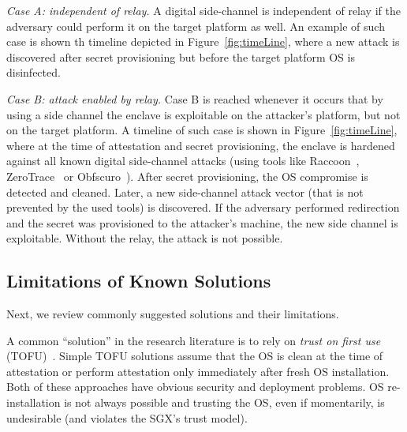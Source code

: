 \begin{mylist}
    \item[\emph{Case A: independent of relay.}] A digital side-channel is independent of relay if the adversary could perform it on the target platform as well. An example of such case is shown th timeline depicted in Figure~\ref{fig:timeLine}, where a new attack is discovered after secret provisioning but before the target platform OS is disinfected.
    

    \item[\emph{Case B: attack enabled by relay.}] Case B is reached whenever it occurs that by using a side channel the enclave is exploitable on the attacker's platform, but not on the target platform. 
    A timeline of such case is shown in Figure~\ref{fig:timeLine}, where at the time of attestation and secret provisioning, the enclave is hardened against all known digital side-channel attacks (using tools like Raccoon~\cite{raccoon}, ZeroTrace~\cite{zerotrace} or Obfscuro~\cite{obfscuro}). After secret provisioning, the OS compromise is detected and cleaned. Later, a new side-channel attack vector (that is not prevented by the used tools) is discovered. If the adversary performed redirection and the secret was provisioned to the attacker's machine, the new side channel is exploitable. Without the relay, the attack is not possible.
    

\end{mylist}


\subsection{Limitations of Known Solutions}
\label{sec:problemStatement:limitations}

Next, we review commonly suggested solutions and their limitations.

A common ``solution'' in the research literature is to rely on \emph{trust on first use} (TOFU)~\cite{tofu}. Simple TOFU solutions assume that the OS is clean at the time of attestation or perform attestation only immediately after fresh OS installation. Both of these approaches have obvious security and deployment problems. OS re-installation is not always possible and trusting the OS, even if momentarily, is undesirable (and violates the SGX's trust model).

